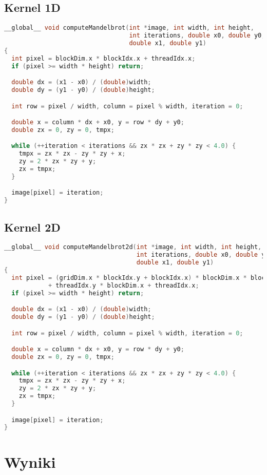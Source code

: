 \documentclass[12pt, a4paper]{article}
\begin{document}
\subsection*{Kernel 1D}
\begin{lstlisting}[language = C++]
__global__ void computeMandelbrot(int *image, int width, int height,
                                  int iterations, double x0, double y0,
                                  double x1, double y1)
{
  int pixel = blockDim.x * blockIdx.x + threadIdx.x;
  if (pixel >= width * height) return;

  double dx = (x1 - x0) / (double)width;
  double dy = (y1 - y0) / (double)height;

  int row = pixel / width, column = pixel % width, iteration = 0;

  double x = column * dx + x0, y = row * dy + y0;
  double zx = 0, zy = 0, tmpx;

  while (++iteration < iterations && zx * zx + zy * zy < 4.0) {
    tmpx = zx * zx - zy * zy + x;
    zy = 2 * zx * zy + y;
    zx = tmpx;
  }

  image[pixel] = iteration;
}
\end{lstlisting}

\subsection*{Kernel 2D}
\begin{lstlisting}[language = C++]
__global__ void computeMandelbrot2d(int *image, int width, int height,
                                    int iterations, double x0, double y0,
                                    double x1, double y1)
{
  int pixel = (gridDim.x * blockIdx.y + blockIdx.x) * blockDim.x * blockDim.y
            + threadIdx.y * blockDim.x + threadIdx.x;
  if (pixel >= width * height) return;

  double dx = (x1 - x0) / (double)width;
  double dy = (y1 - y0) / (double)height;

  int row = pixel / width, column = pixel % width, iteration = 0;

  double x = column * dx + x0, y = row * dy + y0;
  double zx = 0, zy = 0, tmpx;

  while (++iteration < iterations && zx * zx + zy * zy < 4.0) {
    tmpx = zx * zx - zy * zy + x;
    zy = 2 * zx * zy + y;
    zx = tmpx;
  }

  image[pixel] = iteration;
}
\end{lstlisting}

\section*{Wyniki}
\end{document}
